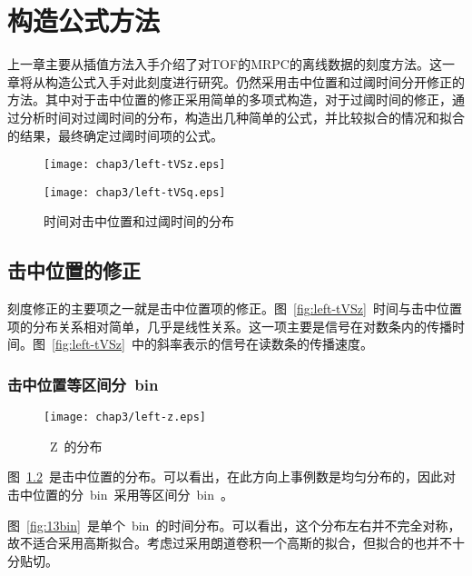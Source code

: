 \chapter{构造公式方法}
上一章主要从插值方法入手介绍了对TOF的MRPC的离线数据的刻度方法。这一章将从构造公式入手对此刻度进行研究。仍然采用击中位置和过阈时间分开修正的方法。其中对于击中位置的修正采用简单的多项式构造，对于过阈时间的修正，通过分析时间对过阈时间的分布，构造出几种简单的公式，并比较拟合的情况和拟合的结果，最终确定过阈时间项的公式。

\begin{figure}[!h]
\begin{minipage}[!h]{0.5\linewidth}
\texttt{[image: chap3/left-tVSz.eps]}
\label{fig:left-tVSz}
\end{minipage}%
\hfill
\begin{minipage}[!h]{0.5\linewidth}
\texttt{[image: chap3/left-tVSq.eps]}
\label{fig:left-tVSq}
\end{minipage}
\caption{时间对击中位置和过阈时间的分布}
\end{figure}

\section{击中位置的修正}
刻度修正的主要项之一就是击中位置项的修正。图~\ref{fig:left-tVSz}~时间与击中位置项的分布关系相对简单，几乎是线性关系。这一项主要是信号在对数条内的传播时间。图~\ref{fig:left-tVSz}~中的斜率表示的信号在读数条的传播速度。
\subsection{击中位置等区间分~bin~}

\begin{figure}[htbp]
\centering
\texttt{[image: chap3/left-z.eps]}
\caption{~Z~的分布}
\label{fig:left-z}
\end{figure}

图~\ref{fig:left-z}~是击中位置的分布。可以看出，在此方向上事例数是均匀分布的，因此对击中位置的分~bin~采用等区间分~bin~。

图~\ref{fig:13bin}~是单个~bin~的时间分布。可以看出，这个分布左右并不完全对称，故不适合采用高斯拟合。考虑过采用朗道卷积一个高斯的拟合，但拟合的也并不十分贴切。

